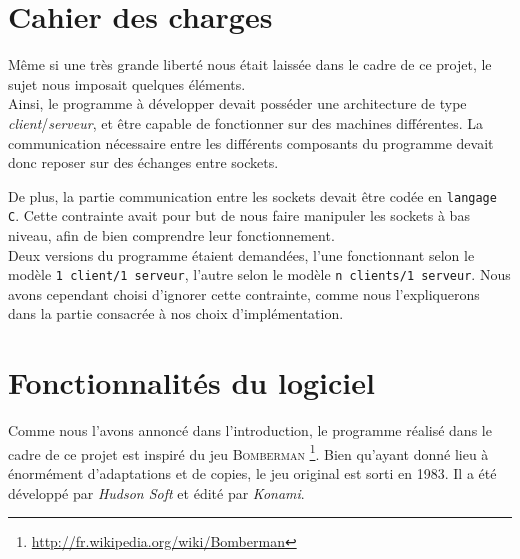 \section*{Cahier des charges}

Même si une très grande liberté nous était laissée dans le cadre de ce projet, le sujet nous imposait quelques éléments.\\

Ainsi, le programme à développer devait posséder une architecture de type \textit{client}/\textit{serveur}, et être capable de fonctionner sur des machines différentes. La communication nécessaire entre les différents composants du programme devait donc reposer sur des échanges entre sockets.

De plus, la partie communication entre les sockets devait être codée en \texttt{langage C}. Cette contrainte avait pour but de nous faire manipuler les sockets à bas niveau, afin de bien comprendre leur fonctionnement.\\

Deux versions du programme étaient demandées, l'une fonctionnant selon le modèle \texttt{1 client/1 serveur}, l'autre selon le modèle \texttt{n clients/1 serveur}. Nous avons cependant choisi d'ignorer cette contrainte, comme nous l'expliquerons dans la partie consacrée à nos choix d'implémentation.

\section*{Fonctionnalités du logiciel}

Comme nous l'avons annoncé dans l'introduction, le programme réalisé dans le cadre de ce projet est inspiré du jeu \textsc{Bomberman} \footnote{\url{http://fr.wikipedia.org/wiki/Bomberman}}. Bien qu'ayant donné lieu à énormément d'adaptations et de copies, le jeu original est sorti en 1983. Il a été développé par \textit{Hudson Soft} et édité par \textit{Konami}.\\

